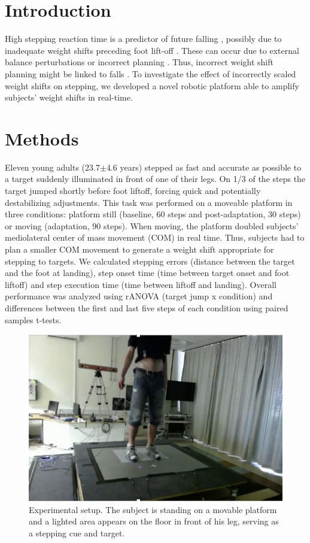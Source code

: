 
\section{Introduction} 
High stepping reaction time is a predictor of future falling \cite{Lord2001}, possibly due to inadequate weight shifts preceding foot lift-off \cite{Cohen2011}\cite{Sparto2013}. These can occur due to external balance perturbations \cite{Mille2014} or incorrect planning \cite{Cohen2011}\cite{Sparto2013}. Thus, incorrect weight shift planning might be linked to falls \cite{Robinovitch2013}. To investigate the effect of incorrectly scaled weight shifts on stepping, we developed a novel robotic platform able to amplify subjects’ weight shifts in real-time.

\section{Methods}
Eleven young adults (23.7$\pm$4.6 years) stepped as fast and accurate as possible to a target suddenly illuminated in front of one of their legs. On 1/3 of the steps the target jumped shortly before foot liftoff, forcing quick and potentially destabilizing adjustments. This task was performed on a moveable platform in three conditions: platform still (baseline, 60 steps and post-adaptation, 30 steps) or moving (adaptation, 90 steps). When moving, the platform doubled subjects’ mediolateral center of mass movement (COM) in real time. Thus, subjects had to plan a smaller COM movement to generate a weight shift appropriate for stepping to targets.
We calculated stepping errors (distance between the target and the foot at landing), step onset time (time between target onset and foot liftoff) and step execution time (time between liftoff and landing). Overall performance was analyzed using rANOVA (target jump x condition) and differences between the first and last five steps of each condition using paired samples t-tests.

\begin{figure}[!ht]
	\centering
	\includegraphics[width=0.6\linewidth]{"Zrinka/methods"}
	\caption{Experimental setup. The subject is standing on a movable platform and a lighted area appears on the floor in front of his leg, serving as a stepping cue and target.}
	\label{fig:expSetup}
	\vspace{-4 mm}
\end{figure}

